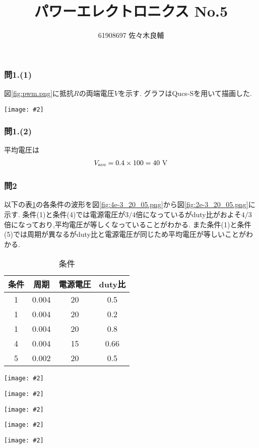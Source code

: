 \documentclass[uplatex,a4j,11pt,dvipdfmx]{jsarticle}
\makeatletter
\def\fgcaption{\def\@captype{figure}\caption}
\newcommand{\mfig}[3][width=15cm]{
\begin{center}
\texttt{[image: \#2]}
\fgcaption{#3 \label{fig:#2}}
\end{center}
}
\makeatother
\begin{document}
\title{パワーエレクトロニクス No.5}
\author{61908697 佐々木良輔}
\date{}
\maketitle
\subsubsection*{問1.(1)}
図\ref{fig:pwm.png}に抵抗$R$の両端電圧$V$を示す.
グラフはQucs-Sを用いて描画した.
\mfig[width=10cm]{pwm.png}{電圧$V$}
\subsubsection*{問1.(2)}
平均電圧は
\begin{align}
  V_{\rm ave}=0.4\times100=40\ \si{\volt}
\end{align}
\subsubsection*{問2}
以下の表\ref{tab:cond}の各条件の波形を図\ref{fig:4e-3_20_05.png}から図\ref{fig:2e-3_20_05.png}に示す.
条件(1)と条件(4)では電源電圧が$3/4$倍になっているがduty比がおよそ$4/3$倍になっており,平均電圧が等しくなっていることがわかる.
また条件(1)と条件(5)では周期が異なるがduty比と電源電圧が同じため平均電圧が等しいことがわかる.
\begin{table}[h]
\caption{条件}
\label{tab:cond}
\centering
\begin{tabular}{cccc}
\hline
条件&周期&電源電圧&duty比\\
\hline \hline
1&0.004&20&0.5\\
1&0.004&20&0.2\\
1&0.004&20&0.8\\
4&0.004&15&0.66\\
5&0.002&20&0.5\\
\hline
\end{tabular}
\end{table}
\newpage
\mfig[width=10cm]{4e-3_20_05.png}{条件(1)の波形}
\mfig[width=10cm]{4e-3_20_02.png}{条件(2)の波形}
\newpage
\mfig[width=10cm]{4e-3_20_08.png}{条件(3)の波形}
\mfig[width=10cm]{4e-3_15_066.png}{条件(4)の波形}
\newpage
\mfig[width=10cm]{2e-3_20_05.png}{条件(5)の波形}
\end{document}
